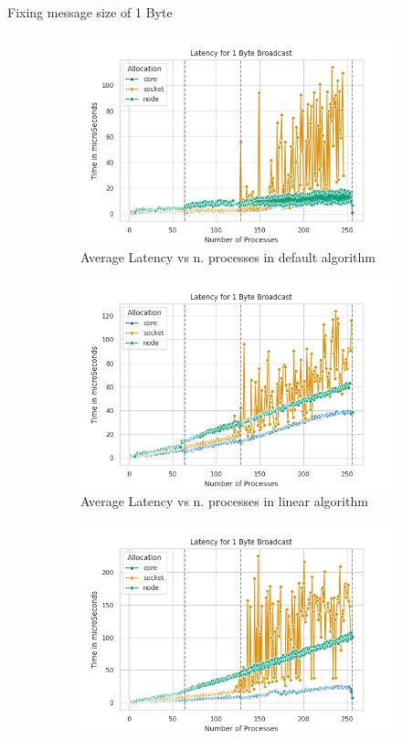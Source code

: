 \documentclass[11pt]{beamer}
\begin{document}
\begin{frame}{Fixing message size of 1 Byte}
	
	\begin{figure}[h]
		\centering
		\begin{subfigure}{0.45\textwidth}
			\centering
			\includegraphics[width=0.7\linewidth]{../exercise1/plots/bcast_default_1byte}
			\caption{Average Latency vs n. processes in default algorithm}
			\label{fig:bcastdefault1byte}
		\end{subfigure}
		\begin{subfigure}{0.45\textwidth}
			\centering
			\includegraphics[width=0.7\linewidth]{../exercise1/plots/bcast_linear_1byte}
			\caption{Average Latency vs n. processes in linear algorithm}
			\label{fig:bcastlinear1byte}
		\end{subfigure}
		\begin{subfigure}{0.45\textwidth}
			\centering
			\includegraphics[width=0.7\linewidth]{../exercise1/plots/bcast_chain_1byte}

\end{subfigure}
\end{figure}
\end{frame}
\end{document}
